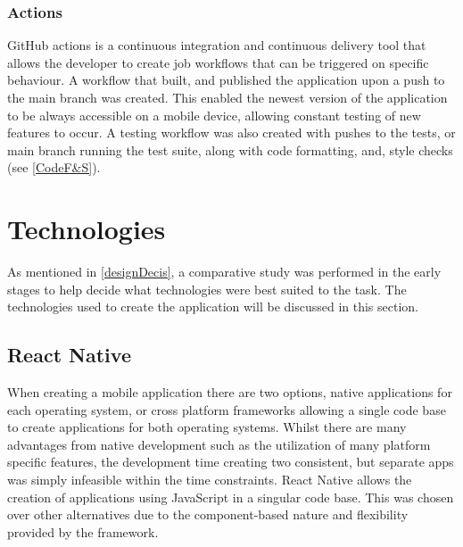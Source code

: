 \subsubsection{Actions}\label{ghActions}
GitHub actions is a continuous integration and continuous delivery tool that allows the developer to create job workflows that can be triggered on specific behaviour. A workflow that built, and published the application upon a push to the main branch was created. This enabled the newest version of the application to be always accessible on a mobile device, allowing constant testing of new features to occur. A testing workflow was also created with pushes to the tests, or main branch running the test suite, along with code formatting, and, style checks (see \ref{CodeF&S}).
\section{Technologies}
As mentioned in \ref{designDecis}, a comparative study \cite{compStudy} was performed in the early stages to help decide what technologies were best suited to the task. The technologies used to create the application will be discussed in this section.
\subsection{React Native}\label{reactSection}
When creating a mobile application there are two options, native applications for each operating system, or cross platform frameworks allowing a single code base to create applications for both operating systems. Whilst there are many advantages from native development such as the utilization of many platform specific features, the development time creating two consistent, but separate apps was simply infeasible within the time constraints. React Native \cite{reactnative} allows the creation of applications using JavaScript \cite{js} in a singular code base. This was chosen over other alternatives due to the component-based nature and flexibility provided by the framework.
